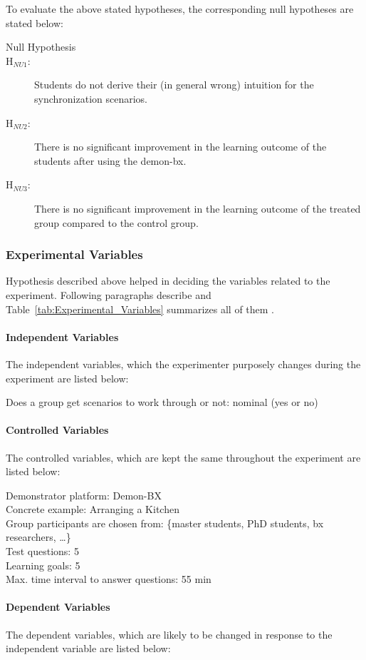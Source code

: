 To evaluate the above stated hypotheses, the corresponding null hypotheses are stated below:
\begin{description}
	\item[Null Hypothesis]
	\item[H$_{NU1}$:] Students do not derive their (in general wrong) intuition for the synchronization scenarios.
	\item[H$_{NU2}$:] There is no significant improvement in the learning outcome of the students after using the demon-bx.
	\item[H$_{NU3}$:] There is no significant improvement in the learning outcome of the treated group compared to the control group.

\end{description}

\subsubsection{Experimental Variables}\label{subsubsec:expvariables}
Hypothesis described above helped in deciding the variables related to the experiment. Following paragraphs describe and Table~\ref{tab:Experimental_Variables} summarizes all of them .

\paragraph{Independent Variables} The independent variables, which the experimenter purposely changes during the experiment are listed below:

Does a group get scenarios to work through or not: nominal (yes or no)

\paragraph{Controlled Variables} The controlled variables, which are kept the same throughout the experiment are listed below:

Demonstrator platform: Demon-BX\\
Concrete example: Arranging a Kitchen\\
Group participants are chosen from: \{master students, PhD students, bx researchers, \ldots \}\\
Test questions: 5\\
Learning goals: 5\\
Max. time interval to answer questions: 55 min

\paragraph{Dependent Variables} The dependent variables, which are likely to be changed in response to the independent variable are listed below:

